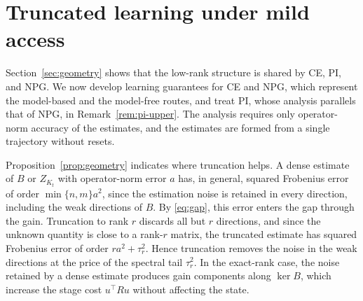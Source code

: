 \section{Truncated learning under mild access}\label{sec:upper}

Section~\ref{sec:geometry} shows that the low-rank structure is shared by
CE, PI, and NPG. We now develop learning guarantees for CE and NPG, which
represent the model-based and the model-free routes, and treat PI, whose
analysis parallels that of NPG, in Remark~\ref{rem:pi-upper}. The
analysis requires only operator-norm accuracy of the estimates, and the
estimates are formed from a single trajectory without resets.

Proposition~\ref{prop:geometry} indicates where truncation helps. A dense
estimate of $B$ or $Z_{K_t}$ with operator-norm error $a$ has, in
general, squared Frobenius error of order $\min\{n,m\}a^2$, since the
estimation noise is retained in every direction, including the weak
directions of $B$. By \eqref{eq:gap}, this error enters the gap through
the gain. Truncation to rank $r$ discards all but $r$ directions, and
since the unknown quantity is close to a rank-$r$ matrix, the truncated
estimate has squared Frobenius error of order $ra^2+\tau_r^2$. Hence
truncation removes the noise in the weak directions at the price of the
spectral tail $\tau_r^2$. In the exact-rank case, the noise retained by
a dense estimate produces gain components along $\ker B$, which increase
the stage cost $u^\top Ru$ without affecting the state.


